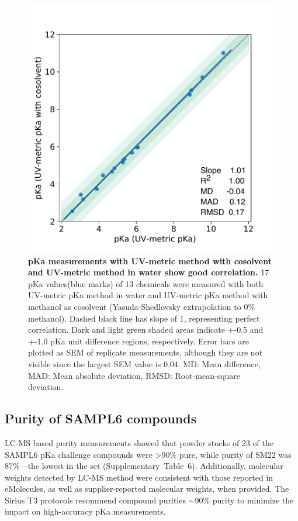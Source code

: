 \documentclass[9pt,lineno]{elife}
\begin{document}
\begin{figure}
\begin{center}
\includegraphics[width=0.5\linewidth]{figures/water_vs_cosolvent_pKa_values_correlation_figure.pdf}
\caption{{\bf pKa measurements with UV-metric method with cosolvent and UV-metric method in water show good correlation.} 
17 pKa values(blue marks) of 13 chemicals were measured with both UV-metric pKa method in water and UV-metric pKa method with methanol as cosolvent (Yasuda-Shedlovsky extrapolation to 0\% methanol). Dashed black line has slope of 1, representing perfect correlation.  Dark and light green shaded areas indicate +-0.5 and +-1.0 pKa unit difference regions, respectively. Error bars are plotted as SEM of replicate measurements, although they are not visible since the largest SEM value is 0.04. MD: Mean difference, MAD: Mean absolute deviation, RMSD: Root-mean-square deviation.  
}
\label{fig:water_vs_cosolvent_pKa_correlation}
\end{center}
\end{figure}

\subsection{Purity of SAMPL6 compounds}
LC-MS based purity measurements showed that powder stocks of 23 of the SAMPL6 pKa challenge compounds were >90\% pure, while purity of SM22 was 87\%---the lowest in the set (Supplementary~Table~6).  
Additionally, molecular weights detected by LC-MS method were consistent with those reported in eMolecules, as well as supplier-reported molecular weights, when provided. 
The Sirius T3 protocols recommend compound purities $\sim$90\% purity to minimize the impact on high-accuracy pKa measurements. 
\end{document}

